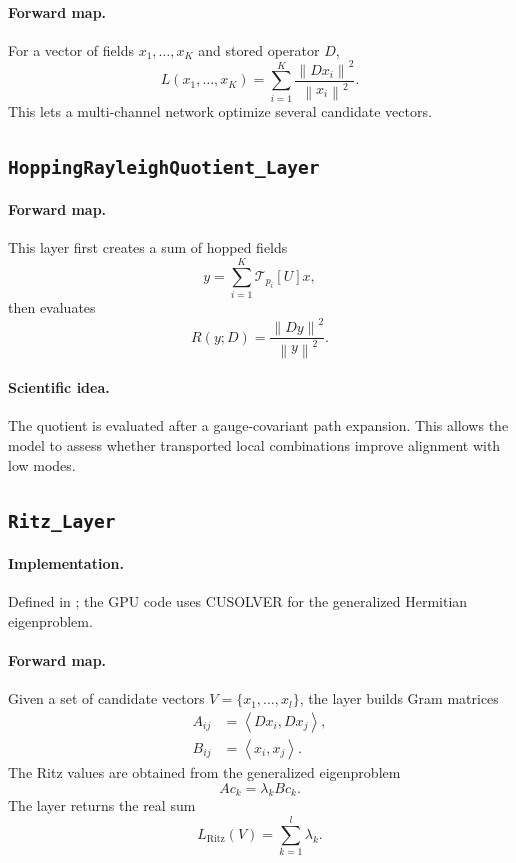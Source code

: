 \documentclass[11pt]{article}
\newcommand{\code}[1]{\texttt{\detokenize{#1}}}
\newcommand{\U}{U}
\newcommand{\norm}[1]{\left\lVert #1 \right\rVert}
\newcommand{\inner}[2]{\left\langle #1, #2 \right\rangle}
\newcommand{\pathop}{\mathcal{T}}
\newcommand{\dirac}{D}
\begin{document}
\paragraph{Forward map.}
For a vector of fields $x_1,\dots,x_K$ and stored operator $\dirac$,
\[
  L(x_1,\dots,x_K)
  =
  \sum_{i=1}^{K}
  \frac{\norm{\dirac x_i}^{2}}{\norm{x_i}^{2}}.
\]
This lets a multi-channel network optimize several candidate vectors.

\subsection[HoppingRayleighQuotient Layer]{\texttt{HoppingRayleighQuotient\_Layer}}

\paragraph{Forward map.}
This layer first creates a sum of hopped fields
\[
  y = \sum_{i=1}^{K}\pathop_{p_i}[\U]x,
\]
then evaluates
\[
  R(y;\dirac)
  =
  \frac{\norm{\dirac y}^{2}}{\norm{y}^{2}}.
\]

\paragraph{Scientific idea.}
The quotient is evaluated after a gauge-covariant path expansion. This allows
the model to assess whether transported local combinations improve alignment
with low modes.

\subsection[Ritz Layer]{\texttt{Ritz\_Layer}}

\paragraph{Implementation.}
Defined in \code{src/layers/ritz.jl}; the GPU code uses CUSOLVER for the
generalized Hermitian eigenproblem.

\paragraph{Forward map.}
Given a set of candidate vectors $V=\{x_1,\dots,x_l\}$, the layer builds Gram
matrices
\begin{align}
  A_{ij} &= \inner{\dirac x_i}{\dirac x_j},\\
  B_{ij} &= \inner{x_i}{x_j}.
\end{align}
The Ritz values are obtained from the generalized eigenproblem
\[
  A c_k = \lambda_k B c_k.
\]
The layer returns the real sum
\[
  L_{\mathrm{Ritz}}(V)
  =
  \sum_{k=1}^{l}\lambda_k.
\]
\end{document}
